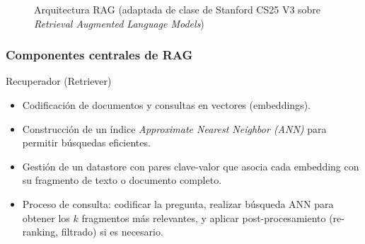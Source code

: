 \documentclass[handout]{beamer}
\begin{document}
\begin{frame}
\begin{figure}
    \caption{Arquitectura RAG (adaptada de clase de Stanford CS25 V3 sobre \textit{Retrieval Augmented Language Models})}
  \end{figure}
\end{frame}

\begin{frame}
  \frametitle{Componentes centrales de RAG}
  \begin{block}{Recuperador (Retriever)}
    \begin{itemize}
      \item Codificación de documentos y consultas en vectores (embeddings).
      \item Construcción de un índice \textit{Approximate Nearest Neighbor (ANN)} para permitir búsquedas eficientes.
      \item Gestión de un datastore con pares clave-valor que asocia cada embedding con su fragmento de texto o documento completo.
      \item Proceso de consulta: codificar la pregunta, realizar búsqueda ANN para obtener los \(k\) fragmentos más relevantes, y aplicar post-procesamiento (re-ranking, filtrado) si es necesario.
    \end{itemize}
  \end{block}
\end{frame}
\end{document}
